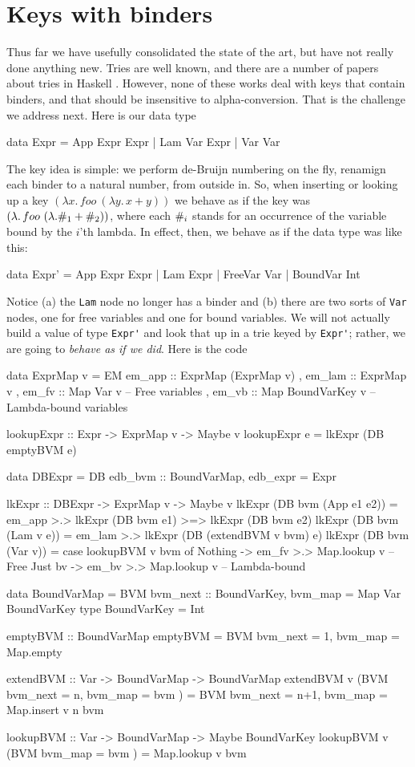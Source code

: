 \documentclass[acmsmall]{acmart}
\theoremstyle{theorem}
\theoremstyle{definition}
\theoremstyle{remark}
\begin{document}
\section{Keys with binders} \label{sec:binders}

Thus far we have usefully consolidated the state of the art, but have not really done
anything new.  Tries are well known, and there are a number of papers about
tries in Haskell \cite{hinze etc}.  However, none of these works deal with keys that contain
binders, and that should be insensitive to alpha-conversion.  That is the challenge we
address next.  Here is our data type
\begin{code}
data Expr = App Expr Expr | Lam Var Expr | Var Var
\end{code}
The key idea is simple: we perform de-Bruijn numbering on the fly,
renamign each binder to a natural number, from outside in.
So, when inserting or looking up a key $(\lambda x.\, foo~ (\lambda y.\, x+y))$ we
behave as if the key was $(\lambda.\, foo ~(\lambda. \#_{1} + \#_{2}))$, where
each $\#_{i}$ stands for an occurrence of the variable bound by the $i$'th lambda.
In effect, then, we behave as if the data type was like this:
\begin{code}
data Expr' = App Expr Expr | Lam Expr | FreeVar Var | BoundVar Int
\end{code}
Notice (a) the \lstinline{Lam} node no longer has a binder and (b) there are
two sorts of \lstinline{Var} nodes, one for free variables and one for bound
variables. We will not actually build a value of type \lstinline{Expr'} and look
that up in a trie keyed by \lstinline{Expr'}; rather,
we are going to \emph{behave as if we did}. Here is the code
\begin{code}
data ExprMap v = EM { em_app :: ExprMap (ExprMap v)
                    , em_lam :: ExprMap v
                    , em_fv  :: Map Var v           -- Free variables
                    , em_vb  :: Map BoundVarKey v } -- Lambda-bound variables

lookupExpr :: Expr -> ExprMap v -> Maybe v
lookupExpr e = lkExpr (DB emptyBVM e)

data DBExpr = DB { edb_bvm :: BoundVarMap, edb_expr = Expr }

lkExpr :: DBExpr -> ExprMap v -> Maybe v
lkExpr (DB bvm (App e1 e2)) = em_app >.> lkExpr (DB bvm e1) >=> lkExpr (DB bvm e2)
lkExpr (DB bvm (Lam v e))   = em_lam >.> lkExpr (DB (extendBVM v bvm) e)
lkExpr (DB bvm (Var v))     = case lookupBVM v bvm of
                                Nothing -> em_fv  >.> Map.lookup v  -- Free
                                Just bv -> em_bv  >.> Map.lookup v  -- Lambda-bound

data BoundVarMap = BVM { bvm_next :: BoundVarKey, bvm_map = Map Var BoundVarKey }
type BoundVarKey = Int

emptyBVM :: BoundVarMap
emptyBVM = BVM { bvm_next = 1, bvm_map = Map.empty }

extendBVM :: Var -> BoundVarMap -> BoundVarMap
extendBVM v (BVM { bvm_next = n, bvm_map = bvm })
  = BVM { bvm_next = n+1, bvm_map = Map.insert v n bvm }

lookupBVM :: Var -> BoundVarMap -> Maybe BoundVarKey
lookupBVM v (BVM {bvm_map = bvm }) = Map.lookup v bvm
\end{code}
\end{document}

